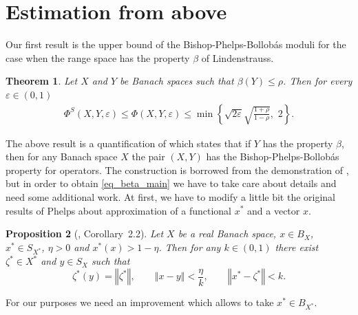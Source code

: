 \documentclass[11pt,a4paper]{amsart}
\newcommand{\norm}[1]{\left\Vert#1\right\Vert}
\numberwithin{equation}{section}
\theoremstyle{plain}
\newtheorem{theorem}{Theorem}[section]
\newtheorem{prop}[theorem]{Proposition}
\theoremstyle{definition}
\renewcommand{\leq}{\leqslant}
\begin{document}


\section{Estimation from above}\label{sec2}

Our first result is the upper bound of the Bishop-Phelps-Bollob\'{a}s moduli for the case when the range space has the property $\beta$ of Lindenstrauss.

\begin{theorem}\label{th:est_beta}
Let $X$ and $Y$ be Banach spaces such that $\beta(Y)\leq\rho$. Then for every $\varepsilon\in(0, 1)$
\begin{align}\label{eq_beta_main}
\Phi^S(X,Y,\varepsilon)\leq\Phi(X,Y,\varepsilon)\leq \min\left\{ \sqrt{2\varepsilon}\sqrt{\frac{1+\rho}{1-\rho}},\,\, 2\right\}.
\end{align}

\end{theorem}

The above result is a quantification of  \cite[Theorem 2.2]{Acosta2008} which states that if $Y$ has the property $\beta$, then for any Banach space $X$ the pair $(X, Y)$ has the Bishop-Phelps-Bollob\'{a}s property for operators. The construction is borrowed from the demonstration of \cite[Theorem 2.2]{Acosta2008}, but in order to obtain \eqref{eq_beta_main} we have to take care about details and need some additional work. At first, we have to modify a little bit the original results of Phelps about approximation of a functional $x^*$ and a vector $x$. 
 \begin{prop}[\cite{Phelps}, Corollary~2.2] \label{Corollary2.2Phelps} Let $X$ be a real Banach space, $x\in B_X$, $x^*\in S_{X^*}$, $\eta > 0$ and $x^*(x)> 1-\eta$. Then for any $k\in (0,1)$ there exist $\zeta^*\in X^*$ and $y\in S_X$ such that 
\begin{equation*} 
 \zeta^*(y) = \norm{\zeta^*},\qquad \norm{x-y} < \frac{\eta}{k}, \qquad \norm{x^*-\zeta^*} <  k.
\end{equation*}
\end{prop}

For our purposes we need an improvement which allows to take $x^*\in B_{X^*}$. 
\end{document}

